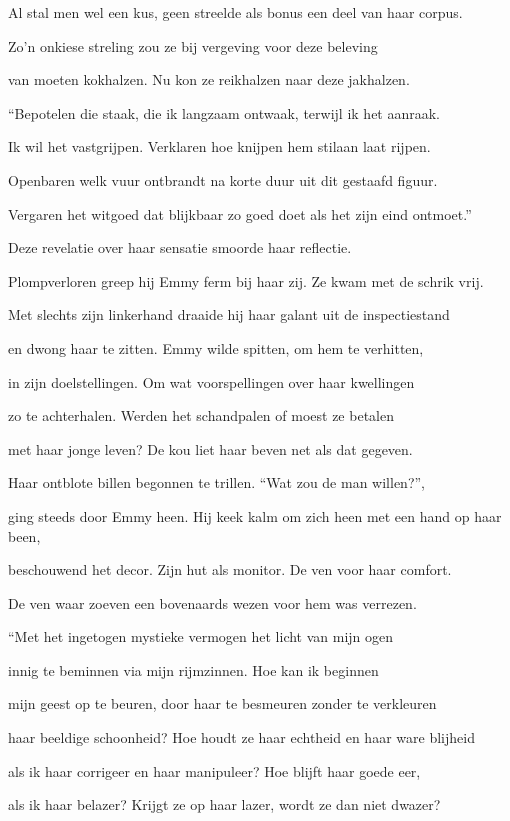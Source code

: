 Al stal men wel een kus,
geen streelde als bonus
een deel van haar corpus.

Zo’n onkiese streling
zou ze bij vergeving
voor deze beleving

van moeten kokhalzen.
Nu kon ze reikhalzen
naar deze jakhalzen.

“Bepotelen die staak,
die ik langzaam ontwaak,
terwijl ik het aanraak.

Ik wil het vastgrijpen.
Verklaren hoe knijpen
hem stilaan laat rijpen.

Openbaren welk vuur
ontbrandt na korte duur
uit dit gestaafd figuur.

Vergaren het witgoed
dat blijkbaar zo goed doet
als het zijn eind ontmoet.”

Deze revelatie
over haar sensatie
smoorde haar reflectie.

Plompverloren greep hij
Emmy ferm bij haar zij.
Ze kwam met de schrik vrij.

Met slechts zijn linkerhand
draaide hij haar galant
uit de inspectiestand

en dwong haar te zitten.
Emmy wilde spitten,
om hem te verhitten,

in zijn doelstellingen.
Om wat voorspellingen
over haar kwellingen

zo te achterhalen.
Werden het schandpalen
of moest ze betalen

met haar jonge leven?
De kou liet haar beven
net als dat gegeven.

Haar ontblote billen
begonnen te trillen.
“Wat zou de man willen?”,

ging steeds door Emmy heen.
Hij keek kalm om zich heen
met een hand op haar been,

beschouwend het decor.
Zijn hut als monitor.
De ven voor haar comfort.

De ven waar zoeven
een bovenaards wezen
voor hem was verrezen.

“Met het ingetogen
mystieke vermogen
het licht van mijn ogen

innig te beminnen
via mijn rijmzinnen.
Hoe kan ik beginnen

mijn geest op te beuren,
door haar te besmeuren
zonder te verkleuren

haar beeldige schoonheid?
Hoe houdt ze haar echtheid
en haar ware blijheid

als ik haar corrigeer
en haar manipuleer?
Hoe blijft haar goede eer,

als ik haar belazer?
Krijgt ze op haar lazer,
wordt ze dan niet dwazer?

